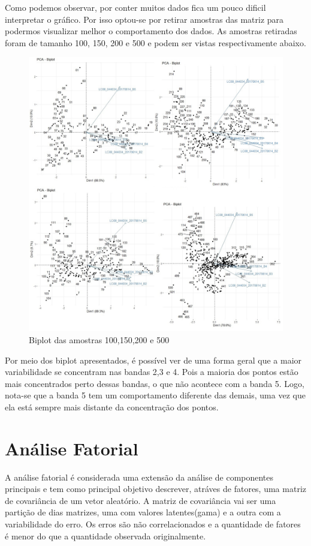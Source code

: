 \documentclass[a4paper,12pt]{article}
\begin{document}
Como podemos observar, por conter muitos dados fica um pouco dificil interpretar o gráfico. Por isso optou-se por retirar amostras das matriz para podermos visualizar melhor o comportamento dos dados. As amostras retiradas foram de tamanho 100, 150, 200 e 500 e podem ser vistas respectivamente abaixo.

\begin{center}
\begin{figure}[H]
    \centering
    \includegraphics[width = 0.9 \textwidth]{Sem título.jpg}
    \caption{Biplot das amostras 100,150,200 e 500}
\end{figure}    
\end{center}

Por meio dos biplot apresentados, é possível ver de uma forma geral que a  maior variabilidade se concentram nas bandas 2,3 e 4. Pois a maioria dos pontos estão mais concentrados perto dessas bandas, o que não acontece com a banda 5. Logo, nota-se que a banda 5 tem um comportamento diferente das demais, uma vez que ela está sempre mais distante da concentração dos pontos.


\section{Análise Fatorial}

A análise fatorial é considerada uma extensão da análise de componentes principais e tem como principal objetivo descrever, atráves de fatores, uma matriz de covariância de um vetor aleatório. A matriz de covariância vai ser uma partição de dias matrizes, uma com valores latentes(gama) e a outra com a variabilidade do erro. Os erros são não correlacionados e a quantidade de fatores é menor do que a quantidade observada originalmente.\\
\end{document}
